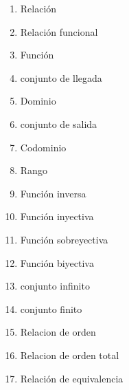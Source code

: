 \documentclass{book}
\numberwithin{equation}{section}
\theoremstyle{plain}  %
\begin{document}
    \begin{enumerate}
        \item Relación
        \item Relación funcional
        \item Función
        \item conjunto de llegada
        \item Dominio
        \item conjunto de salida
        \item Codominio 
        \item Rango
        \item Función inversa
        \item Función inyectiva 
        \item Función sobreyectiva 
        \item Función biyectiva 
        \item conjunto infinito 
        \item conjunto finito 
        \item Relacion de orden 
        \item Relacion de orden total 
        \item Relación de equivalencia 
    \end{enumerate}
\end{document}
